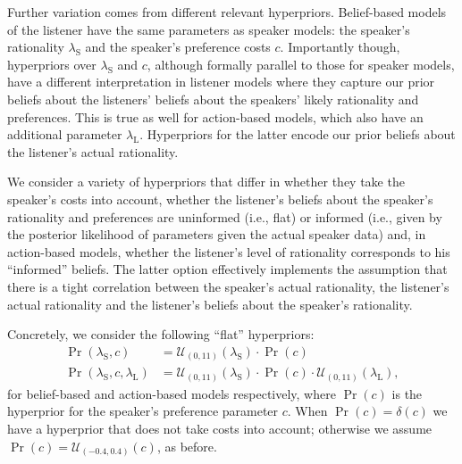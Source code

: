 Further variation comes from different relevant
hyperpriors. Belief-based models of the listener have the same
parameters as speaker models: the speaker's rationality
$\lambda_\mathrm{S}$ and the speaker's preference costs
$c$. Importantly though, hyperpriors over $\lambda_\mathrm{S}$ and
$c$, although formally parallel to those for speaker models, have a
different interpretation in listener models where they capture our
prior beliefs about the listeners' beliefs about the speakers' likely
rationality and preferences. This is true as well for action-based
models, which also have an additional parameter
$\lambda_\mathrm{L}$. Hyperpriors for the latter encode our prior
beliefs about the listener's actual rationality.

We consider a variety of hyperpriors that differ in whether they take
the speaker's costs into account, whether the listener's beliefs about
the speaker's rationality and preferences are uninformed (i.e., flat)
or informed (i.e., given by the posterior likelihood of parameters
given the actual speaker data) and, in action-based models, whether
the listener's level of rationality corresponds to his ``informed''
beliefs. The latter option effectively implements the assumption that
there is a tight correlation between the speaker's actual rationality,
the listener's actual rationality and the listener's beliefs about the
speaker's rationality.

Concretely, we consider the following ``flat'' hyperpriors:
\begin{align*}
  \Pr(\lambda_\mathrm{S},c) & =
  \mathcal{U}_{(0,11)}(\lambda_\mathrm{S}) \cdot
  \Pr(c) \\
  \Pr(\lambda_\mathrm{S},c,\lambda_\mathrm{L}) & = 
  \mathcal{U}_{(0,11)}(\lambda_\mathrm{S}) \cdot
    \Pr(c) \cdot  \mathcal{U}_{(0,11)}(
    \lambda_\mathrm{L}),
\end{align*}
for belief-based and action-based models respectively, where $\Pr(c)$
is the hyperprior for the speaker's preference parameter $c$. When
$\Pr(c) = \delta(c)$ we have a hyperprior that does not take costs
into account; otherwise we assume $\Pr(c) =
\mathcal{U}_{(-0.4,0.4)}(c)$, as before.


